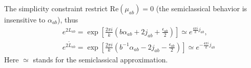 \documentclass[aps,prd,notitlepage,nofootinbib,superscriptaddress,groupedaddress,twocolumn]{revtex4-1}
\def\be{\begin{eqnarray}}
\def\ee{\end{eqnarray}}
\newcommand{\scrq}{\mathscr{Q}}
\renewcommand{\a}{\alpha}
\begin{document}
The simplicity constraint restrict $\mathrm{Re}(\mu_{ab})=0$ (the semiclassical behavior is insensitive to $\a_{ab}$), thus 
\be
&&%
e^{2 L_{a b}}=\exp \left[\frac{2 \pi i}{k}\left(b \alpha_{a b}+2j_{a b}+\frac{\epsilon_{ab}}{2}\right)\right]\simeq e^{\frac{4 \pi i}{k}j_{ab}},\nonumber\\
&&%
e^{2 \widetilde{L}_{a b}}= \exp \left[\frac{2 \pi i}{k}\left(b^{-1} \alpha_{a b}-2j_{a b}-\frac{\epsilon_{ab}}{2}\right)\right]\simeq e^{-\frac{4 \pi i}{k}j_{ab}}\nonumber
\ee
Here $\simeq$ stands for the semiclassical approximation.  %
\end{document}

